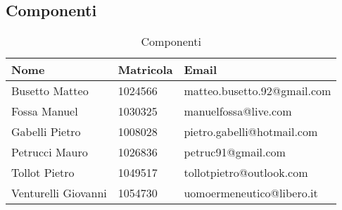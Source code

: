 \subsection{Componenti}
	\begin{table}[H]
		\centering
	  \begin{tabular}{p{}p{}
		    							p{}}
		   \toprule Nome & Matricola & Email \\
		   \midrule
		   Busetto Matteo & 1024566 & matteo.busetto.92@gmail.com \\
		   Fossa Manuel & 1030325  &  manuelfossa@live.com\\
		   Gabelli Pietro & 1008028 & pietro.gabelli@hotmail.com \\
		   Petrucci Mauro & 1026836 & petruc91@gmail.com \\
		   Tollot Pietro & 1049517 &  tollotpietro@outlook.com\\
		   Venturelli Giovanni & 1054730 &  uomoermeneutico@libero.it\\
		   \bottomrule
	 \end{tabular}
	 	\label{tab:Componenti}
	 	\caption{Componenti}
	\end{table}
